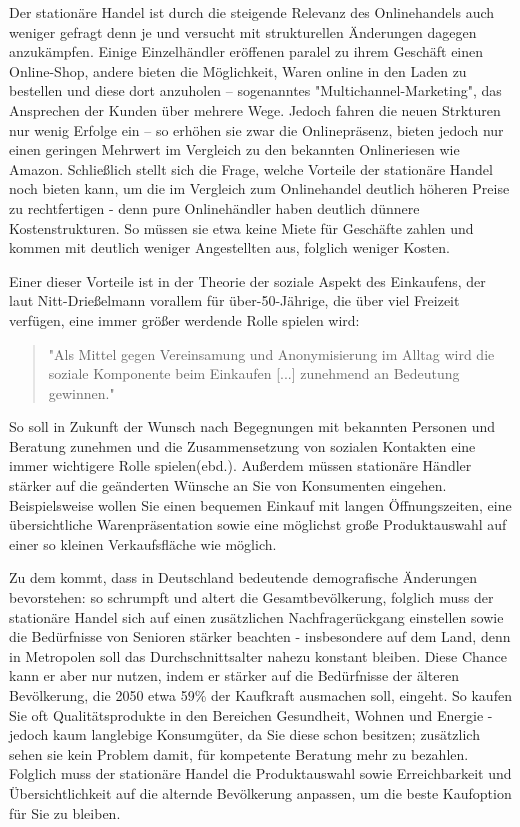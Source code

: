 \begin{folding} %
Der stationäre Handel ist durch die steigende Relevanz des Onlinehandels auch weniger gefragt denn je und versucht mit strukturellen Änderungen dagegen anzukämpfen. Einige Einzelhändler eröffenen paralel zu ihrem Geschäft einen Online-Shop, andere bieten die Möglichkeit, Waren online in den Laden zu bestellen und diese dort anzuholen – sogenanntes "Multichannel-Marketing", das Ansprechen der Kunden über mehrere Wege\cite[S. 34f]{Graf}. Jedoch fahren die neuen Strkturen nur wenig Erfolge ein – so erhöhen sie zwar die Onlinepräsenz, bieten jedoch nur einen geringen Mehrwert im Vergleich zu den bekannten Onlineriesen wie Amazon\cite[S. 34f]{Graf}. 
Schließlich stellt sich die Frage, welche Vorteile der stationäre Handel noch bieten kann, um die im Vergleich zum Onlinehandel deutlich höheren Preise zu rechtfertigen - denn pure Onlinehändler haben deutlich dünnere Kostenstrukturen\cite[S. 14]{evilcom}. So müssen sie etwa keine Miete für Geschäfte zahlen und kommen mit deutlich weniger Angestellten aus, folglich weniger Kosten.

Einer dieser Vorteile ist in der Theorie der soziale Aspekt des Einkaufens, der laut Nitt-Drießelmann vorallem für über-50-Jährige, die über viel Freizeit verfügen, eine immer größer werdende Rolle spielen wird\cite[S. 43f]{Nitt}:
\begin{quote}
"Als Mittel gegen Vereinsamung und Anonymisierung im Alltag wird die soziale Komponente beim Einkaufen [...] zunehmend an Bedeutung gewinnen."\cite[S. 43]{Nitt}
\end{quote} 
So soll in Zukunft der Wunsch nach Begegnungen mit bekannten Personen und Beratung zunehmen und die Zusammensetzung von sozialen Kontakten eine immer wichtigere Rolle spielen(ebd.).
Außerdem müssen stationäre Händler stärker auf die geänderten Wünsche an Sie von Konsumenten eingehen. Beispielsweise wollen Sie einen bequemen Einkauf mit langen Öffnungszeiten, eine übersichtliche Warenpräsentation sowie eine möglichst große Produktauswahl auf einer so kleinen Verkaufsfläche wie möglich\cite[S. 61]{Nitt}.

Zu dem kommt, dass in Deutschland bedeutende demografische Änderungen bevorstehen: so schrumpft und altert die Gesamtbevölkerung, folglich muss der stationäre Handel sich auf einen zusätzlichen Nachfragerückgang einstellen sowie die Bedürfnisse von Senioren stärker beachten - insbesondere auf dem Land, denn in Metropolen soll das Durchschnittsalter nahezu konstant bleiben\cite[S. 32ff]{Nitt}. Diese Chance kann er aber nur nutzen, indem er stärker auf die Bedürfnisse der älteren Bevölkerung, die 2050 etwa 59\% der Kaufkraft ausmachen soll, eingeht\cite[S. 64]{Nitt}. So kaufen Sie oft Qualitätsprodukte in den Bereichen Gesundheit, Wohnen und Energie - jedoch kaum langlebige Konsumgüter, da Sie diese schon besitzen; zusätzlich sehen sie kein Problem damit, für kompetente Beratung mehr zu bezahlen\cite[S. 41f]{Nitt}. Folglich muss der stationäre Handel die Produktauswahl sowie Erreichbarkeit und Übersichtlichkeit auf die alternde Bevölkerung anpassen, um die beste Kaufoption für Sie zu bleiben\cite[S. 64]{Nitt}.


\end{folding}
